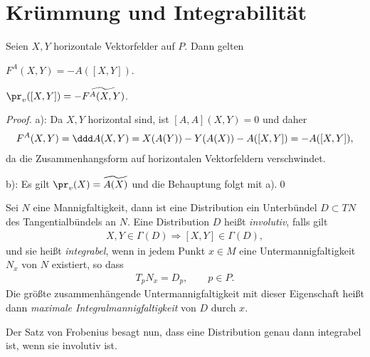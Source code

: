 \documentclass[%
	paper=a5,%
	fleqn,%
	DIV=18,%
	BCOR=0mm,
	fontsize=11pt,
	titlepage=false,%
	bibliography=totoc,
	DIV=18,%
	twoside=true,
	pdftitle=Riemannsche Geometrie,
	pdfauthor=Uwe Semmelmann,
	numbers=noendperiod]%
	{scrbook}
\begin{document}
\section{Krümmung und Integrabilität}

\begin{prop}
\label{prop:Krümmung-v-Projektion}
Seien $X,Y$ horizontale Vektorfelder auf $P$. Dann gelten
\begin{propenum}
\item $F^A(X,Y) = -A([X,Y])$.
\item $\pr_v([X,Y]) = -\widetilde{F^A(X,Y)}$.\fish
\end{propenum}
\end{prop}
\begin{proof}
a): Da $X,Y$ horizontal sind, ist $[A,A](X,Y) = 0$ und daher
\begin{align*}
F^A(X,Y) = \ddd A(X,Y) = X(A(Y)) - Y(A(X)) - A([X,Y])
= -A([X,Y]),
\end{align*}
da die Zusammenhangsform auf horizontalen Vektorfeldern verschwindet.

b): Es gilt $\pr_v(X) = \widetilde{A(X)}$ und die Behauptung folgt mit a).\qed
\end{proof}

\begin{rem}[Erinnerung.]
Sei $N$ eine Mannigfaltigkeit, dann ist eine Distribution ein Unterbündel
$D\subset TN$ des Tangentialbündels an $N$. Eine Distribution $D$ heißt
\emph{involutiv}, falls gilt
\begin{align*}
X,Y\in \Gamma(D) \Rightarrow [X,Y]\in\Gamma(D),
\end{align*} 
und sie heißt \emph{integrabel}, wenn in jedem Punkt $x\in M$ eine
Untermannigfaltigkeit $N_x$ von $N$ existiert, so dass
\begin{align*}
T_p N_x = D_p,\qquad p\in P.
\end{align*}
Die größte zusammenhängende Untermannigfaltigkeit mit dieser Eigenschaft heißt
dann \emph{maximale Integralmannigfaltigkeit} von $D$ durch $x$.

Der Satz von Frobenius besagt nun, dass eine Distribution genau dann integrabel
ist, wenn sie involutiv ist.\map
\end{rem}
\end{document}
